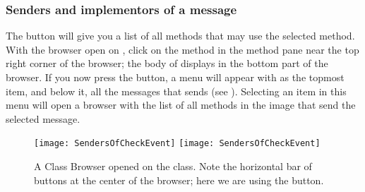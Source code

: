 \documentclass[a4paper,10pt,twoside]{book}
\begin{document}

\subsubsection{Senders and implementors of a message}
\label{sec:sendersImplementors}

The  button will give you a list of all methods that may use the selected method. With the browser open on , click on the  method in the method pane near the top right corner of the browser; the body of  displays in the bottom part of the browser. If you now press the  button, a menu will appear with  as the topmost item, and below it, all the messages that  sends (see ).  Selecting an item in this menu will open a browser with the list of all methods in the image that send the selected message. 

\begin{figure}[htbp]
	\begin{center}
   \ifluluelse
		{\texttt{[image: SendersOfCheckEvent]}}
		{\texttt{[image: SendersOfCheckEvent]}}
	\end{center}
	\caption{A Class Browser opened on the  class. Note the horizontal bar of buttons at the center of the browser; here we are using the  button.}
	\label{fig:SendersOfCheckEvent}
\end{figure}
\end{document}
